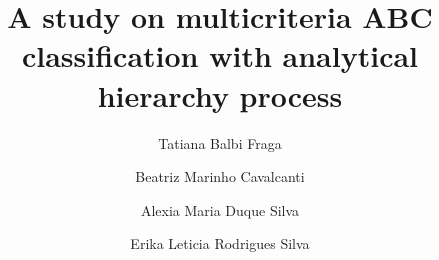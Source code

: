 \documentclass[authoryear,manuscript,12pt]{elsarticle}
\begin{document}
\begin{frontmatter}


\title{A study on multicriteria ABC classification with analytical hierarchy process}



\author{Tatiana Balbi Fraga}

\author{Beatriz Marinho Cavalcanti}

\author{Alexia Maria Duque Silva}

\author{Erika Leticia Rodrigues Silva}



\end{frontmatter}
\end{document}
